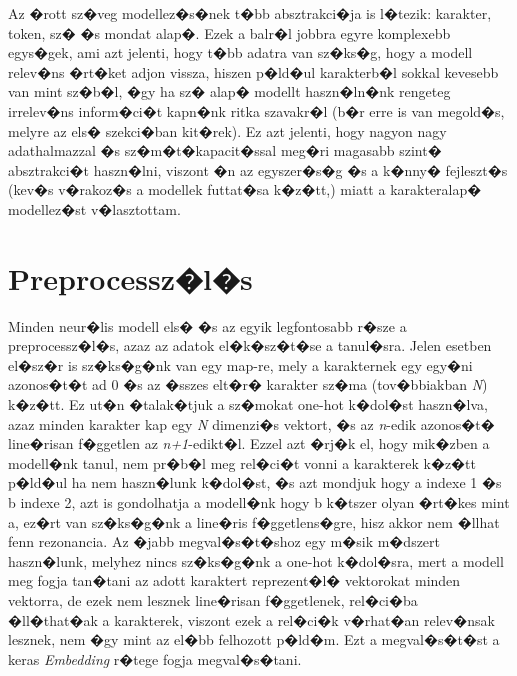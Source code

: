 \documentclass[12pt]{report}
\theoremstyle{definition}
\begin{document}
Az �rott sz�veg modellez�s�nek t�bb absztrakci�ja is l�tezik: karakter, token, sz� �s mondat alap�.
Ezek a balr�l jobbra egyre komplexebb egys�gek, ami azt jelenti, hogy t�bb adatra van sz�ks�g, hogy a modell relev�ns �rt�ket adjon vissza, hiszen p�ld�ul karakterb�l sokkal kevesebb van mint sz�b�l, �gy ha sz� alap� modellt haszn�ln�nk rengeteg irrelev�ns inform�ci�t kapn�nk ritka szavakr�l (b�r erre is van megold�s, melyre az els� szekci�ban kit�rek). Ez azt jelenti, hogy nagyon nagy adathalmazzal �s sz�m�t�kapacit�ssal meg�ri magasabb szint� absztrakci�t haszn�lni, viszont �n az egyszer�s�g �s a k�nny� fejleszt�s (kev�s v�rakoz�s a modellek futtat�sa k�z�tt,) miatt a karakteralap� modellez�st v�lasztottam.

\section{Preprocessz�l�s}

Minden neur�lis modell els� �s az egyik legfontosabb r�sze a preprocessz�l�s, 
azaz az adatok el�k�sz�t�se a tanul�sra. 
Jelen esetben el�sz�r is sz�ks�g�nk van egy map-re, mely a karakternek egy 
egy�ni azonos�t�t ad 0 �s az �sszes elt�r� karakter sz�ma (tov�bbiakban 
\textit{N}) k�z�tt. Ez ut�n �talak�tjuk a sz�mokat one-hot k�dol�st haszn�lva, 
azaz minden karakter kap egy \textit{N} dimenzi�s vektort, �s az 
\textit{n}-edik azonos�t� line�risan f�ggetlen az \textit{n+1}-edikt�l. Ezzel 
azt �rj�k el, hogy mik�zben a modell�nk tanul, nem pr�b�l meg rel�ci�t vonni a 
karakterek k�z�tt p�ld�ul ha nem haszn�lunk k�dol�st, �s azt mondjuk hogy a 
indexe 1 �s b indexe 2, azt is gondolhatja a modell�nk hogy b k�tszer olyan 
�rt�kes mint a, ez�rt van sz�ks�g�nk a line�ris f�ggetlens�gre, hisz akkor nem 
�llhat fenn rezonancia. %
Az �jabb megval�s�t�shoz egy m�sik m�dszert haszn�lunk, melyhez nincs sz�ks�g�nk a one-hot k�dol�sra, mert a modell meg fogja tan�tani az adott karaktert reprezent�l� vektorokat minden vektorra, de ezek nem lesznek line�risan f�ggetlenek, rel�ci�ba �ll�that�ak a karakterek, viszont ezek a rel�ci�k v�rhat�an relev�nsak lesznek, nem �gy mint az el�bb felhozott p�ld�m. Ezt a megval�s�t�st a keras \textit{Embedding} r�tege fogja megval�s�tani.

\end{document}
